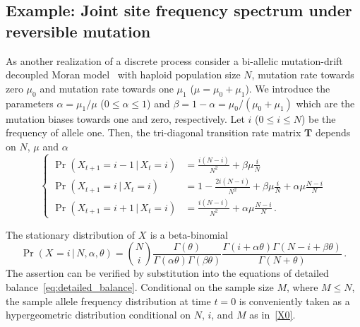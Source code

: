 \documentclass[preprint]{elsarticle}
\newcommand\given{{\,|\,}}
\newcommand\x[1]{\ensuremath{X_{#1}}}
\begin{document}
\subsection{Example: Joint site frequency spectrum under reversible mutation}\label{section:discr_rev_general}
As another realization of a discrete process consider a bi-allelic mutation-drift decoupled Moran model~\citep{Baak08,Ethe09} with haploid population size $N$, mutation rate towards zero $\mu_0$ and mutation rate towards one $\mu_1$ ($\mu=\mu_0+\mu_1$).  We introduce the parameters $\alpha=\mu_1/\mu$ ($0 \leq \alpha \leq 1$) and $\beta=1-\alpha=\mu_0/(\mu_0+\mu_1)$ which are the mutation biases towards one and zero, respectively.  Let $i$ ($0\leq i\leq N$) be the frequency of allele one. Then, the tri-diagonal transition rate matrix $\mathbf{T}$ depends on $N$, $\mu$ and $\alpha$
\begin{equation}\label{eq:transition_decoupled_Moran}
\begin{cases}
\Pr(\x{t+1}=i-1\given \x{t}=i)&=\frac{i(N-i)}{N^2}+\beta\mu \frac{i}{N}\\
    \Pr(\x{t+1}=i\given \x{t}=i)&=1-\frac{2i(N-i)}{N^2}+\beta\mu \frac{i}{N} + \alpha\mu \frac{N-i}N\\
\Pr(\x{t+1}=i+1\given \x{t}=i)&=\frac{i(N-i)}{N^2}+\alpha\mu \frac{N-i}N\,.
\end{cases}
\end{equation}

The stationary distribution of $\x{}$ is a beta-binomial
\begin{equation}\label{beta_bin}
\Pr(\x{}=i\given N,\alpha,\theta)=\binom{N}{i}
\frac{\Gamma(\theta)}{\Gamma(\alpha\theta)\Gamma(\beta\theta)}
\frac{\Gamma(i+\alpha\theta)\Gamma(N-i+\beta\theta)}{\Gamma(N+\theta)}\,.
\end{equation}
The assertion can be verified by substitution into the equations of detailed balance~\eqref{eq:detailed_balance}. Conditional on the sample size $M$, where $M\leq N$, the sample allele frequency distribution at time $t=0$ is conveniently taken as a hypergeometric distribution conditional on $N$, $i$, and $M$ as in~\eqref{X0}.

\end{document}
